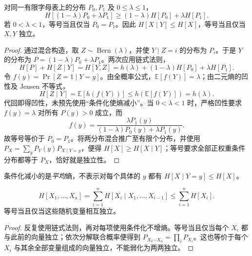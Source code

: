 \documentclass[lang=cn,a4paper,fontset=none,zihao=false,10pt,openany,twoside]{beautybook}
\numberwithin{algorithm}{chapter}
\begin{document}
\begin{proposition}[熵的凹性与条件化]\label{prop:entropy-concavity}
对同一有限字母表上的分布 $P_0,P_1$ 及 $0\le\lambda\le1$，
\[
 H[(1-\lambda)P_0+\lambda P_1]\ge(1-\lambda)H[P_0]+\lambda H[P_1].
\]
若 $0<\lambda<1$，等号当且仅当 $P_0=P_1$。因此 $H[X\mid Y]\le H[X]$，等号当且仅当 $X,Y$ 独立。
\end{proposition}
\begin{proof}
通过混合构造，取 $Z\sim\operatorname{Bern}(\lambda)$，并使 $Y\mid Z=i$ 的分布为 $P_i$。于是 $Y$ 的分布为 $P=(1-\lambda)P_0+\lambda P_1$。两次应用链式法则，
\[
 H[P]+H[Z\mid Y]=H[Y,Z]=h(\lambda)+(1-\lambda)H[P_0]+\lambda H[P_1].
\]
令 $f(y)=\Pr[Z=1\mid Y=y]$。由全概率公式，$\mathbb E[f(Y)]=\lambda$；由二元熵的凹性及 Jensen 不等式，
\[
 H[Z\mid Y]=\mathbb E[h(f(Y))]\le h(\mathbb E[f(Y)])=h(\lambda).
\]
代回即得凹性，未预先使用“条件化使熵减小”。当 $0<\lambda<1$ 时，严格凹性要求 $f(y)=\lambda$ 对所有 $P(y)>0$ 成立，而
\[
 f(y)=\frac{\lambda P_1(y)}{(1-\lambda)P_0(y)+\lambda P_1(y)}.
\]
故等号等价于 $P_0=P_1$。将两分布混合推广至有限个分布，并使用
$P_X=\sum_yP_Y(y)P_{X\mid Y=y}$，便得 $H[X]\ge H[X\mid Y]$；等号要求全部正权重条件分布都等于 $P_X$，恰好就是独立性。
\end{proof}
条件化减小的是\emph{平均}熵，不表示对每个具体的 $y$ 都有 $H[X\mid Y=y]\le H[X]$。
\begin{corollary}[联合熵的次可加性]\label{cor:entropy-subadditive}
\[
 H[X_1,\ldots,X_n]=\sum_{i=1}^nH[X_i\mid X_1,\ldots,X_{i-1}]
 \le\sum_{i=1}^nH[X_i].
\]
等号当且仅当这些随机变量相互独立。
\end{corollary}
\begin{proof}
反复使用链式法则，再对每项使用条件化不增熵。等号当且仅当每个 $X_i$ 都与此前的向量独立；依次分解联合概率便得到 $P_{X_1\cdots X_n}=\prod_iP_{X_i}$。这也等价于每个 $X_i$ 与其余全部变量组成的向量独立，不能弱化为两两独立。
\end{proof}
\end{document}
